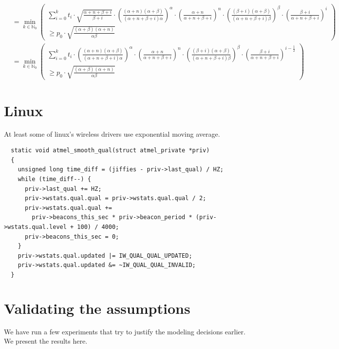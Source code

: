 \documentclass[10pt,a4paper]{article}
\begin{document}
\begin{align*}
                      & = \min_{k \in \mathbb{N}_{0}} \left( \begin{array}{r} \sum_{i = 0}^{k} t_{i} \cdot \sqrt{\frac{\alpha + n + \beta + i}{\beta + i}} \cdot \left( \frac{(\alpha + n)(\alpha + \beta)}{(\alpha + n + \beta + i)\alpha} \right)^{\alpha} \cdot \left( \frac{\alpha + n}{\alpha + n + \beta + i} \right)^{n} \cdot \left( \frac{(\beta + i)(\alpha + \beta)}{(\alpha + n + \beta + i)\beta} \right)^{\beta} \cdot \left( \frac{\beta + i}{\alpha + n + \beta + i} \right)^{i}\\ \ge p_{0} \cdot \sqrt{\frac{(\alpha + \beta)(\alpha + n)}{\alpha\beta}} \end{array} \right)\\
                      & = \min_{k \in \mathbb{N}_{0}} \left( \begin{array}{r} \sum_{i = 0}^{k} t_{i} \cdot \left( \frac{(\alpha + n)(\alpha + \beta)}{(\alpha + n + \beta + i)\alpha} \right)^{\alpha} \cdot \left( \frac{\alpha + n}{\alpha + n + \beta + i} \right)^{n} \cdot \left( \frac{(\beta + i)(\alpha + \beta)}{(\alpha + n + \beta + i)\beta} \right)^{\beta} \cdot \left( \frac{\beta + i}{\alpha + n + \beta + i} \right)^{i - \frac{1}{2}}\\ \ge p_{0} \cdot \sqrt{\frac{(\alpha + \beta)(\alpha + n)}{\alpha\beta}} \end{array} \right)
\end{align*}

\section{Linux}

At least some of linux's wireless drivers use exponential moving average.

\begin{verbatim}
  static void atmel_smooth_qual(struct atmel_private *priv)
  {
    unsigned long time_diff = (jiffies - priv->last_qual) / HZ;
    while (time_diff--) {
      priv->last_qual += HZ;
      priv->wstats.qual.qual = priv->wstats.qual.qual / 2;
      priv->wstats.qual.qual +=
        priv->beacons_this_sec * priv->beacon_period * (priv->wstats.qual.level + 100) / 4000;
      priv->beacons_this_sec = 0;
    }
    priv->wstats.qual.updated |= IW_QUAL_QUAL_UPDATED;
    priv->wstats.qual.updated &= ~IW_QUAL_QUAL_INVALID;
  }
\end{verbatim}

\section{Validating the assumptions}
We have run a few experiments that try to justify the modeling decisions earlier. We present the results here.
\end{document}
